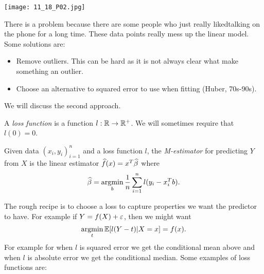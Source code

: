 \begin{center}
    \texttt{[image: 11\_18\_P02.jpg]}
\end{center}
There is a problem because there are some people who just really likedtalking on the phone for a long time. These data points really mess up the linear model. Some solutions are:
\begin{itemize}
    \item Remove outliers. This can be hard as it is not always clear what make something an outlier.
    \item Choose an alternative to squared error to use when fitting (Huber, 70s-90s).
\end{itemize}
We will discuss the second approach.
\begin{defn}
    A \emph{loss function} is a function $l : {\mathbb R} \to {\mathbb R}^+$. We will sometimes require that $l(0)=0$.
\end{defn}
\begin{defn}
    Given data $(x_i,y_i)_{i=1}^n$ and a loss function $l$, the \emph{M-estimator} for predicting $Y$ from $X$ is the linear estimator $\widehat{f}(x) = x^T\widehat{\beta}$ where 
    \[\widehat{\beta} = \operatorname*{argmin}_b \frac{1}{n}\sum_{i=1}^n l(y_i-x_i^Tb).\]
\end{defn}
The rough recipe is to choose a loss to capture properties we want the predictor to have. For example if $Y= f(X)+\varepsilon$, then we might want 
\[\operatorname*{argmin}_t {\mathbb{E}}[l(Y-t)|X=x]=f(x).\]
For example for when $l$ is squared error we get the conditional mean above and when $l$ is absolute error we get the conditional median. Some examples of loss functions are:
